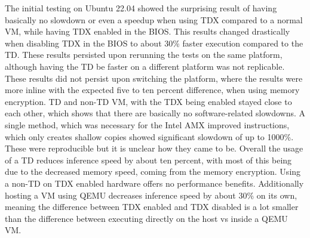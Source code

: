 The initial testing on Ubuntu 22.04 showed the surprising result of having basically no slowdown or even a speedup when using TDX compared to a normal VM, while having TDX enabled in the BIOS. This results changed drastically when disabling TDX in the BIOS to about 30\% faster execution compared to the TD. These results persisted upon rerunning the tests on the same platform, although having the TD be faster on a different platform was not replicable. These results did not persist upon switching the platform, where the results were more inline with the expected five to ten percent difference, when using memory encryption. TD and non-TD VM, with the TDX being enabled stayed close to each other, which shows that there are basically no software-related slowdowns. A single method, which was necessary for the Intel AMX improved instructions, which only creates shallow copies showed significant slowdown of up to 1000\%. These were reproducible but it is unclear how they came to be. Overall the usage of a TD reduces inference speed by about ten percent, with most of this being due to the decreased memory speed, coming from the memory encryption. Using a non-TD on TDX enabled hardware offers no performance benefits. Additionally hosting a VM using QEMU decreases inference speed by about 30\% on its own, meaning the difference between TDX enabled and TDX disabled is a lot smaller than the difference between executing directly on the host vs inside a QEMU VM.



